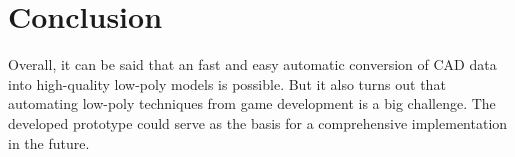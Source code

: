 \documentclass[a4paper, 10pt, journal]{wissarbIEEE}      %
\begin{document}
\section{Conclusion}

Overall, it can be said that an fast and easy automatic conversion of CAD data into high-quality low-poly models is possible. But it also turns out that automating low-poly techniques from game development is a big challenge. The developed prototype could serve as the basis for a comprehensive implementation in the future.


%
%
%
%
%


\end{document}
